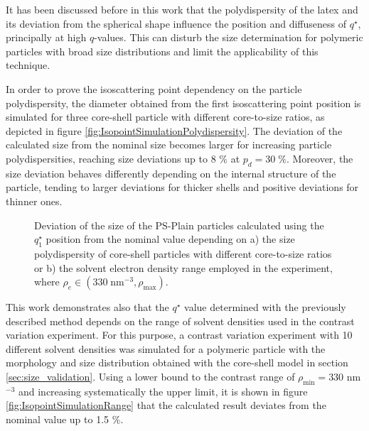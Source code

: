 It has been discussed before in this work that the polydispersity of the latex and its deviation from the spherical shape influence the position and diffuseness of $q^{\star}$, principally at high $q$-values. This can disturb the size determination for polymeric particles with broad size distributions and limit the applicability of this technique. 

In order to prove the isoscattering point dependency on the particle polydispersity, the diameter obtained from the first isoscattering point position is simulated for three core-shell particle with different core-to-size ratios, as depicted in figure \ref{fig:IsopointSimulationPolydispersity}. The deviation of the calculated size from the nominal size becomes larger for increasing particle polydispersities, reaching size deviations up to 8 $\%$ at $p_d = 30\;\%$. Moreover, the size deviation behaves differently depending on the internal structure of the particle, tending to larger deviations for thicker shells and positive deviations for thinner ones.

\begin{figure*}%
	\centering
		\qquad
	\caption[Deviation of the size of the PS-Plain particles obtained with $q_1^{\star}$ from the nominal value.]{Deviation of the size of the PS-Plain particles calculated using the $q_1^{\star}$ position from the nominal value depending on a) the size polydispersity of core-shell particles with different core-to-size ratios or b) the solvent electron density range employed in the experiment, where  $\rho_e \in (330\;\mbox{nm}^{-3}, \rho_{\text{max}})$.}

\end{figure*}

This work demonstrates also that the $q^{\star}$ value determined with the previously described method depends on the range of solvent densities used in the contrast variation experiment. For this purpose,  a contrast variation experiment with 10 different solvent densities was simulated for a polymeric particle with the morphology and size distribution obtained with the core-shell model in section \ref{sec:size_validation}. Using a lower bound to the contrast range of $\rho_{\text{min}}=330$ nm$^{-3}$ and increasing systematically the upper limit, it is shown in figure \ref{fig:IsopointSimulationRange} that the calculated result deviates from the nominal value up to 1.5 $\%$. 

